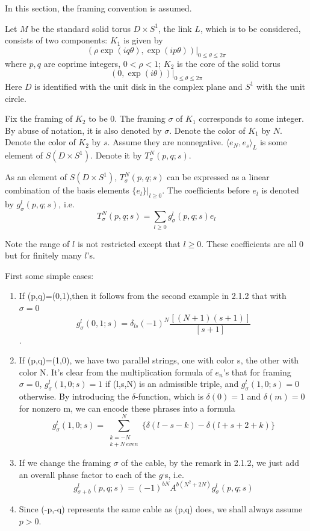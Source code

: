 \label{thm}
 In this section, the framing convention is assumed.

 Let $M$ be the standard solid torus $D \times S^1$, the link $L$, which is to be considered, consists of two components:
 $K_1$ is given by \[( \rho \exp(iq\theta), \exp(ip\theta))|_{0\le \theta \le 2\pi}\]
 where $p,q$ are coprime integers, $0<\rho<1$;
 $K_2$ is the core of the solid torus
 \[(0, \exp(i\theta))|_{0\le \theta \le 2\pi}\]
 Here $D$ is identified with the unit disk in the complex plane and $S^1$ with the unit circle.

  Fix the framing of $K_2$ to be 0.  The framing $\sigma$ of $K_1$ corresponds to some integer. By abuse of notation, it is also denoted by $\sigma$. Denote the color of $K_1$ by $N$. Denote the color of $K_2$ by $s$. Assume they are nonnegative.  $\langle e_N,e_s\rangle_L$ is some element of $S(D \times S^1)$. Denote it by $T_\sigma^N(p,q;s)$.

 As an element of $S(D \times S^1)$, $T_\sigma^N(p,q;s)$ can be expressed as a linear combination of the basis elements $\{e_l\}|_{l\ge 0}$. The coefficients before $e_l$ is denoted by
 $g_\sigma^l(p,q;s)$, i.e.
 \[T_\sigma^N(p,q;s)=\sum_{l\ge 0} g_\sigma^l(p,q;s)e_l\]

 Note the range of $l$ is not restricted except that $l\ge 0$. These coefficients
 are all 0 but for finitely many $l$'s.
 
 First some simple cases:

\begin{enumerate}
        \item If (p,q)=(0,1),then it follows from the second example in 2.1.2 that with $\sigma=0$
                  \[g_\sigma^l(0,1;s)=\delta_{ls}(-1)^N\frac{[(N+1)(s+1)]}{[s+1]}\].
        \item  If (p,q)=(1,0), we have two parallel strings, one with color s, the other with color N. It's clear from the multiplication formula of $e_n$'s that for framing $\sigma=0$, $g_\sigma^l(1,0;s)=1$
                   if (l,s,N) is an admissible triple, and $g_\sigma^l(1,0;s)=0$ otherwise.
                   By introducing the $\delta$-function, which is $\delta(0)=1$ and $\delta(m)=0$ for nonzero m, we can encode these phrases into a formula
                   \[g_\sigma^l(1,0;s)=\sum_{ \substack {k=-N\\ k+N\ even}}^N \{\delta(l-s-k)-\delta(l+s+2+k)\}\]
        \item If we change the framing $\sigma$ of the cable, by the remark in 2.1.2, we just add an overall phase factor to each of the $g^,$s, i.e.
                   \[g_{\sigma+b}^l(p,q;s)=(-1)^{bN}A^{b(N^2+2N)}g_\sigma^l(p,q;s)\]
        \item Since (-p,-q) represents the same cable as (p,q) does, we shall always assume $p>0$.
\end{enumerate}


